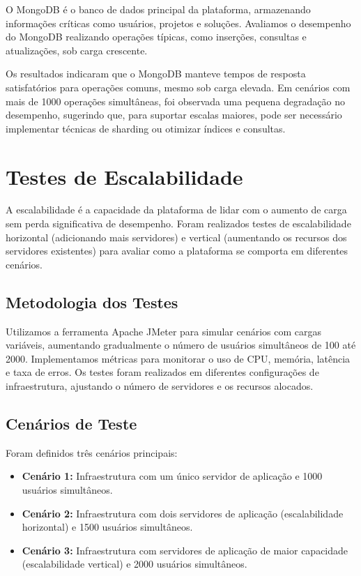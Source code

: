 O MongoDB é o banco de dados principal da plataforma, armazenando informações críticas como usuários, projetos e soluções. Avaliamos o desempenho do MongoDB realizando operações típicas, como inserções, consultas e atualizações, sob carga crescente.

Os resultados indicaram que o MongoDB manteve tempos de resposta satisfatórios para operações comuns, mesmo sob carga elevada. Em cenários com mais de 1000 operações simultâneas, foi observada uma pequena degradação no desempenho, sugerindo que, para suportar escalas maiores, pode ser necessário implementar técnicas de sharding ou otimizar índices e consultas.

\section{Testes de Escalabilidade}

A escalabilidade é a capacidade da plataforma de lidar com o aumento de carga sem perda significativa de desempenho. Foram realizados testes de escalabilidade horizontal (adicionando mais servidores) e vertical (aumentando os recursos dos servidores existentes) para avaliar como a plataforma se comporta em diferentes cenários.

\subsection{Metodologia dos Testes}

Utilizamos a ferramenta Apache JMeter para simular cenários com cargas variáveis, aumentando gradualmente o número de usuários simultâneos de 100 até 2000. Implementamos métricas para monitorar o uso de CPU, memória, latência e taxa de erros. Os testes foram realizados em diferentes configurações de infraestrutura, ajustando o número de servidores e os recursos alocados.

\subsection{Cenários de Teste}

Foram definidos três cenários principais:

\begin{itemize}
    \item \textbf{Cenário 1:} Infraestrutura com um único servidor de aplicação e 1000 usuários simultâneos.
    \item \textbf{Cenário 2:} Infraestrutura com dois servidores de aplicação (escalabilidade horizontal) e 1500 usuários simultâneos.
    \item \textbf{Cenário 3:} Infraestrutura com servidores de aplicação de maior capacidade (escalabilidade vertical) e 2000 usuários simultâneos.
\end{itemize}


